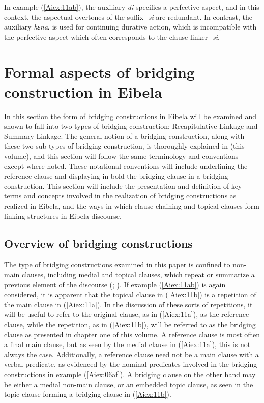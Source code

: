 \documentclass[output=paper]{LSP/langsci}
\begin{document}
In example (\ref{Aiex:11ab}), the auxiliary \textit{di} specifies a perfective aspect, and in this context, the aspectual overtones of the suffix \textit{-si} are redundant. In contrast, the auxiliary \textit{hɛnaː} is used for continuing durative action, which is incompatible with the perfective aspect which often corresponds to the clause linker \textit{-si}.

\section{Formal aspects of bridging construction in Eibela} 
\label{AiFormal.aspects}
In this section the form of bridging constructions in Eibela will be examined and shown to fall into two types of bridging construction: Recapitulative Linkage and Summary Linkage. The general notion of a bridging construction, along with these two sub-types of bridging construction, is thoroughly explained in \citeauthor{guerin18} (this volume), and this section will follow the same terminology and conventions except where noted. These notational conventions will include underlining the reference clause and displaying in bold the bridging clause in a bridging construction. This section will include the presentation and definition of key terms and concepts involved in the realization of bridging constructions as realized in Eibela, and the ways in which clause chaining and topical clauses form linking structures in Eibela discourse. 


\subsection{Overview of bridging constructions} 
\label{AiOverview}
The type of bridging constructions examined in this paper is confined to non-main clauses, including medial and topical clauses, which repeat or summarize a previous element of the discourse (\citealt{devries.2005,devries.2006,dixon09}; \citealt[][382--383]{Thompson.et.al.2007}). If example (\ref{Aiex:11ab}) is again considered, it is apparent that the topical clause in (\ref{Aiex:11b}) is a repetition of the main clause in (\ref{Aiex:11a}). In the discussion of these sorts of repetitions, it will be useful to refer to the original clause, as in (\ref{Aiex:11a}), as the reference clause, while the repetition, as in (\ref{Aiex:11b}), will be referred to as the bridging clause as presented in chapter one of this volume. A reference clause is most often a final main clause, but as seen by the medial clause in (\ref{Aiex:11a}), this is not always the case. Additionally, a reference clause need not be a main clause with a verbal predicate, as evidenced by the nominal predicates involved in the bridging constructions in example (\ref{Aiex:06af}). A bridging clause on the other hand may be either a medial non-main clause, or an embedded topic clause, as seen in the topic clause forming a bridging clause in (\ref{Aiex:11b}).
\end{document}
